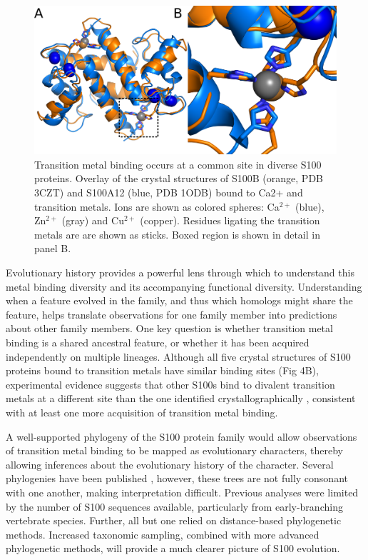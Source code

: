 \begin{figure}
\centering
	\includegraphics{ch3-fig1.png} 
\caption[Transition metal binding occurs at a common site in diverse S100s]{Transition metal binding occurs at a common site in diverse S100 proteins. Overlay of the crystal structures of S100B (orange, PDB 3CZT) and S100A12 (blue, PDB 1ODB) bound to Ca2+ and transition metals. Ions are shown as colored spheres: Ca$^{2+}$ (blue), Zn$^{2+}$ (gray) and Cu$^{2+}$ (copper). Residues ligating the transition metals are are shown as sticks. Boxed region is shown in detail in panel B.\label{samplefigure}}	
\end{figure}

Evolutionary history provides a powerful lens through which to understand
this metal binding diversity and its accompanying functional diversity.
Understanding when a feature evolved in the family, and thus which
homologs might share the feature, helps translate observations for
one family member into predictions about other family members. One
key question is whether transition metal binding is a shared ancestral
feature, or whether it has been acquired independently on multiple
lineages. Although all five crystal structures of S100 proteins bound
to transition metals have similar binding sites (Fig 4B), experimental
evidence suggests that other S100s bind to divalent transition metals
at a different site than the one identified crystallographically \cite{arnesano_structural_2005,koch_implications_2007},
consistent with at least one more acquisition of transition metal
binding.

A well-supported phylogeny of the S100 protein family would allow
observations of transition metal binding to be mapped as evolutionary
characters, thereby allowing inferences about the evolutionary history
of the character. Several phylogenies have been published \cite{zimmer_evolution_2013,marenholz_s100_2004,ravasi_probing_2004,kraemer_structural_2008,shang_chromosomal_2008},
however, these trees are not fully consonant with one another, making
interpretation difficult. Previous analyses were limited by the number
of S100 sequences available, particularly from early-branching vertebrate
species. Further, all but one \cite{kraemer_structural_2008} relied
on distance-based phylogenetic methods. Increased taxonomic sampling,
combined with more advanced phylogenetic methods, will provide a much
clearer picture of S100 evolution.

